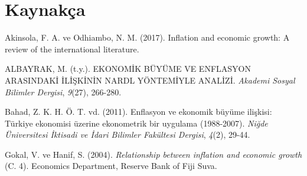 \documentclass[
  12pt,
]{article}
\newlength{\cslhangindent}
\newlength{\cslentryspacingunit} %
\newenvironment{CSLReferences}[2] %
 {%
  \setlength{\parindent}{0pt}
  \ifodd #1
  \let\oldpar\par
  \def\par{\hangindent=\cslhangindent\oldpar}
  \fi
  \setlength{\parskip}{#2\cslentryspacingunit}
 }%
 {}
\begin{document}
\newpage

\hypertarget{references}{%
\section{Kaynakça}\label{references}}

\hypertarget{refs}{}
\begin{CSLReferences}{1}{0}
\leavevmode{}%
Akinsola, F. A. ve Odhiambo, N. M. (2017). Inflation and economic growth: A review of the international literature.

\leavevmode{}%
ALBAYRAK, M. (t.y.). EKONOM{İ}K B{Ü}Y{Ü}ME VE ENFLASYON ARASINDAK{İ} {İ}L{İ}{Ş}K{İ}N{İ}N NARDL Y{Ö}NTEM{İ}YLE ANAL{İ}Z{İ}. \emph{Akademi Sosyal Bilimler Dergisi}, \emph{9}(27), 266-280.

\leavevmode{}%
Bahad, Z. K. H. Ö. T. vd. (2011). Enflasyon ve ekonomik b{ü}y{ü}me ili{ş}kisi: T{ü}rkiye ekonomisi {ü}zerine ekonometrik bir uygulama (1988-2007). \emph{Ni{ğ}de {Ü}niversitesi {İ}ktisadi ve {İ}dari Bilimler Fak{ü}ltesi Dergisi}, \emph{4}(2), 29-44.

\leavevmode{}%
Gokal, V. ve Hanif, S. (2004). \emph{Relationship between inflation and economic growth} (C. 4). Economics Department, Reserve Bank of Fiji Suva.

\end{CSLReferences}
\end{document}
